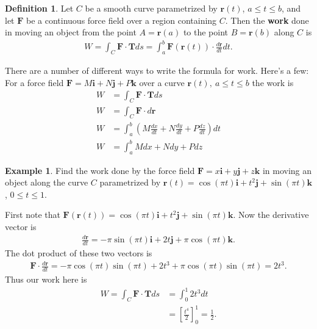 \documentclass[12pt, letter]{article}
\theoremstyle{plain}
\numberwithin{theorem}{section}
\theoremstyle{definition}
\newtheorem{definition}[theorem]{Definition}
\newtheorem{example}[theorem]{Example}
\begin{document}
\begin{definition}
Let $C$ be a smooth curve parametrized by $\bm{r}(t)$, $a\leq t \leq b$, and let $\bm{F}$ be a continuous force field over a region containing $C$. Then the \textbf{work} done in moving an object from the point $A=\bm{r}(a)$ to the point $B=\bm{r}(b)$ along $C$ is
\begin{align*}
W= \int_C \bm{F}\cdot\bm{T}ds = \int_a^b \bm{F}(\bm{r}(t))\cdot\frac{d\bm{r}}{dt}dt.
\end{align*}
\end{definition}

\bigskip

\hrulefill

\bigskip

There are a number of different ways to write the formula for work. Here's a few:
\\
For a force field $\bm{F}=M\bm{i}+N\bm{j}+P\bm{k}$ over a curve $\bm{r}(t), \ a\leq t\leq b$ the work is
\begin{align*}
W&= \int_C \bm{F}\cdot\bm{T} ds\\
W&= \int_C \bm{F}\cdot d\bm{r}\\
W&= \int_a^b \left(M\frac{dx}{dt} + N\frac{dy}{dt}+P\frac{dz}{dt}\right)dt\\
W&= \int_a^b Mdx+Ndy+Pdz
\end{align*}

\bigskip

\hrulefill

\bigskip

\begin{example}
Find the work done by the force field $\bm{F} = x\bm{i}+y\bm{j}+z\bm{k}$ in moving an object along the curve $C$ parametrized by $\bm{r}(t) = \cos(\pi t)\bm{i}+t^2\bm{j}+\sin(\pi t) \bm{k}$, $0\leq t \leq 1$.

\bigskip

First note that $\bm{F}(\bm{r}(t)) = \cos(\pi t)\bm{i}+t^2\bm{j}+\sin(\pi t) \bm{k}$. Now the derivative vector is 
\begin{align*}
\frac{d\bm{r}}{dt} = -\pi \sin(\pi t)\bm{i}+2t\bm{j}+\pi \cos(\pi t) \bm{k}.
\end{align*}
The dot product of these two vectors is
\begin{align*}
\bm{F} \cdot \frac{d\bm{r}}{dt} = -\pi \cos(\pi t) \sin(\pi t) + 2t^3 +\pi \cos(\pi t) \sin(\pi t) = 2t^3.
\end{align*}
Thus our work here is
\begin{align*}
W = \int_C \bm{F} \cdot \bm{T} ds &= \int_0^1  2t^3dt\\
&= \left[\frac{t^4}{2}\right]_0^1 = \frac{1}{2}.
\end{align*}
\end{example}
\end{document}
